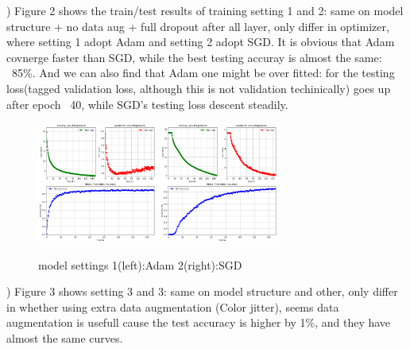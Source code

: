 \documentclass{article}
\begin{document}
) Figure 2 shows the train/test results of training setting 1 and 2: same on model structure + no data aug + full dropout after all layer, only differ in optimizer, where setting 1 adopt Adam and setting 2 adopt SGD. It is obvious that Adam covnerge faster than SGD, while the best testing accuray is almost the same: ~85\%. And we can also find that Adam one might be over fitted: for the testing loss(tagged validation loss, although this is not validation techinically) goes up after epoch ~40, while SGD's testing loss descent steadily.\\
\begin{figure}[H]
  \centering
  \includegraphics[width=0.35\textwidth]{fig/train_result_1.png} %
  \includegraphics[width=0.35\textwidth]{fig/train_result_2.png} %
  \caption{model settings 1(left):Adam 2(right):SGD} %
  \label{fig:curve} %
\end{figure}

) Figure 3 shows setting 3 and 3: same on model structure and other, only differ in whether using extra data augmentation (Color jitter), seems data augmentation is usefull cause the test accuracy is higher by 1\%, and they have almost the same curves.\\
\end{document}
